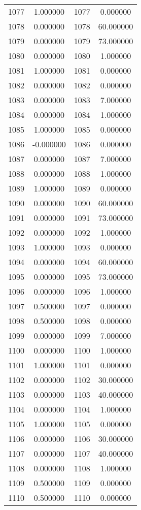 \documentclass[12pt]{article}
\begin{document}
\begin{longtable}{@{}cccc@{}}
1077 & 1.000000 & 1077 & 0.000000 \\
1078 & 0.000000 & 1078 & 60.000000 \\
1079 & 0.000000 & 1079 & 73.000000 \\
1080 & 0.000000 & 1080 & 1.000000 \\
1081 & 1.000000 & 1081 & 0.000000 \\
1082 & 0.000000 & 1082 & 0.000000 \\
1083 & 0.000000 & 1083 & 7.000000 \\
1084 & 0.000000 & 1084 & 1.000000 \\
1085 & 1.000000 & 1085 & 0.000000 \\
1086 & -0.000000 & 1086 & 0.000000 \\
1087 & 0.000000 & 1087 & 7.000000 \\
1088 & 0.000000 & 1088 & 1.000000 \\
1089 & 1.000000 & 1089 & 0.000000 \\
1090 & 0.000000 & 1090 & 60.000000 \\
1091 & 0.000000 & 1091 & 73.000000 \\
1092 & 0.000000 & 1092 & 1.000000 \\
1093 & 1.000000 & 1093 & 0.000000 \\
1094 & 0.000000 & 1094 & 60.000000 \\
1095 & 0.000000 & 1095 & 73.000000 \\
1096 & 0.000000 & 1096 & 1.000000 \\
1097 & 0.500000 & 1097 & 0.000000 \\
1098 & 0.500000 & 1098 & 0.000000 \\
1099 & 0.000000 & 1099 & 7.000000 \\
1100 & 0.000000 & 1100 & 1.000000 \\
1101 & 1.000000 & 1101 & 0.000000 \\
1102 & 0.000000 & 1102 & 30.000000 \\
1103 & 0.000000 & 1103 & 40.000000 \\
1104 & 0.000000 & 1104 & 1.000000 \\
1105 & 1.000000 & 1105 & 0.000000 \\
1106 & 0.000000 & 1106 & 30.000000 \\
1107 & 0.000000 & 1107 & 40.000000 \\
1108 & 0.000000 & 1108 & 1.000000 \\
1109 & 0.500000 & 1109 & 0.000000 \\
1110 & 0.500000 & 1110 & 0.000000 \\

\end{longtable}
\end{document}
